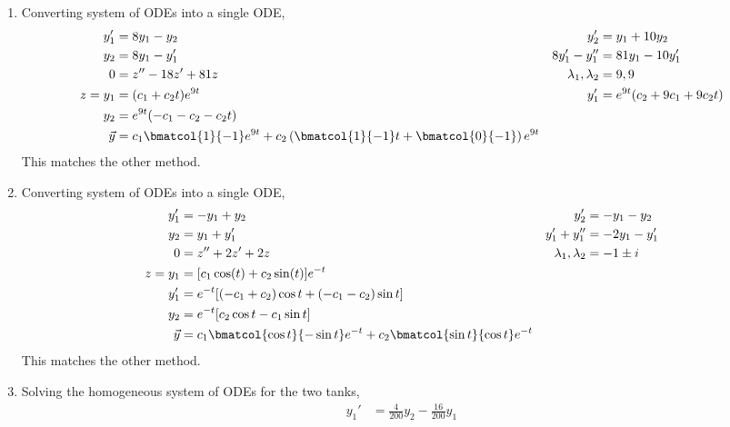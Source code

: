 \begin{enumerate}
\item Converting system of ODEs into a single ODE,
\begin{align}
    y_1'                 & = 8y_1 - y_2                 &
    y_2'                 & = y_1 + 10y_2                  \\
    y_2                  & = 8y_1 - y_1'                &
    8y_1' - y_1''        & = 81y_1 - 10y_1'               \\
    0                    & = z'' - 18z' + 81z           &
    \lambda_1, \lambda_2 & = 9, 9                         \\
    z = y_1              & = (c_1 + c_2t)e^{9t}         &
    y_1'                 & = e^{9t}(c_2 + 9c_1 + 9c_2t)   \\
    y_2                  & = e^{9t}(-c_1 - c_2 - c_2t)    \\
    \vec{y}              & = c_1 \bmatcol{1}{-1}e^{9t}
    + c_2\left( \bmatcol{1}{-1}t + \bmatcol{0}{-1} \right)e^{9t}
\end{align}
This matches the other method.
\item Converting system of ODEs into a single ODE,
\begin{align}
    y_1'                 & = -y_1 + y_2                                       &
    y_2'                 & = -y_1 - y_2                                         \\
    y_2                  & = y_1 + y_1'                                       &
    y_1' + y_1''         & = -2y_1 - y_1'                                       \\
    0                    & = z'' + 2z' + 2z                                   &
    \lambda_1, \lambda_2 & = -1 \pm i                                           \\
    z = y_1              & = [c_1 \cos(t) + c_2\sin(t)]e^{-t}                   \\
    y_1'                 & = e^{-t}[(-c_1 + c_2)\cos t + (-c_1 - c_2) \sin t]   \\
    y_2                  & = e^{-t}[c_2 \cos t - c_1 \sin t]                    \\
    \vec{y}              & = c_1 \bmatcol{\cos t}{-\sin t}e^{-t}
    + c_2\bmatcol{\sin t}{\cos t}e^{-t}
\end{align}
This matches the other method.
\item Solving the homogeneous system of ODEs for the two tanks,
\begin{align}
    y_1'          & = \frac{4}{200}y_2 - \frac{16}{200}y_1

\end{align}
\end{enumerate}
